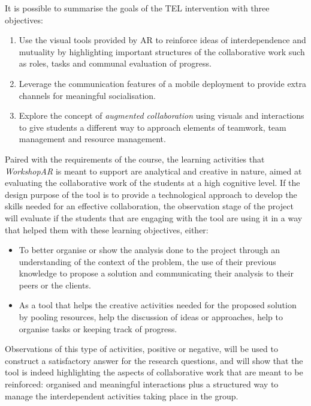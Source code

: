 It is possible to summarise the goals of the TEL intervention with three objectives:

\begin{enumerate}
    \item Use the visual tools provided by \ac{AR} to reinforce ideas of interdependence and mutuality by highlighting important structures of the collaborative work such
    as roles, tasks and communal evaluation of progress.
    \item Leverage the communication features of a mobile deployment to provide extra channels for meaningful socialisation.
    \item Explore the concept of \emph{augmented collaboration} using visuals and interactions to give students a different way to approach elements of teamwork, team
    management and resource management.
\end{enumerate}

Paired with the requirements of the course, the learning activities that \emph{WorkshopAR} is meant to support are analytical and creative in nature, aimed at evaluating the
collaborative work of the students at a high cognitive level. If the design purpose of the tool is to provide a technological approach to develop the skills needed for an
effective collaboration, the observation stage of the project will evaluate if the students that are engaging with the tool are using it in a way that helped them with
these learning objectives, either:

\begin{itemize}
    \item To better organise or show the analysis done to the project through an understanding of the context of the problem, the use of their previous knowledge to
    propose a solution and communicating their analysis to their peers or the clients.
    \item As a tool that helps the creative activities needed for the proposed solution by pooling resources, help the discussion of ideas or approaches, help to organise
    tasks or keeping track of progress.
\end{itemize}

Observations of this type of activities, positive or negative, will be used to construct a satisfactory answer for the research questions, and will show that the tool is
indeed highlighting the aspects of collaborative work that are meant to be reinforced: organised and meaningful interactions plus a structured way to manage the
interdependent activities taking place in the group.


